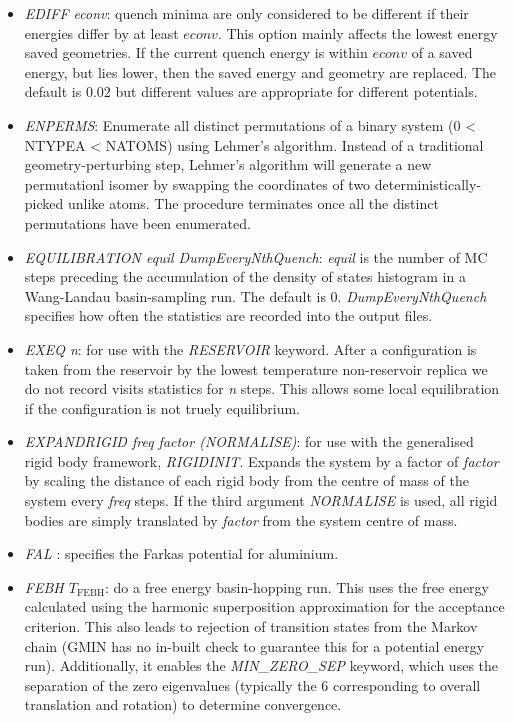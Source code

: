 \documentclass[12pt,a4paper,dvips]{article}
\begin{document}
\begin{itemize}
\item {\it EDIFF econv\/}: quench minima are only considered to be different if their
energies differ by at least $econv$. This option mainly affects the lowest energy
saved geometries. If the current quench energy is within $econv$ of a saved energy, but
lies lower, then the saved energy and geometry are replaced.
The default is $0.02$ but different values are appropriate for different potentials.

\item {\it ENPERMS\/}: Enumerate all distinct permutations of a binary system (0 < NTYPEA < NATOMS) using Lehmer's algorithm. Instead of a traditional geometry-perturbing step, Lehmer's algorithm will generate a new permutationl isomer by swapping the coordinates of two deterministically-picked unlike atoms. The procedure terminates once all the distinct permutations have been enumerated. 
 
\item {\it EQUILIBRATION equil DumpEveryNthQuench\/}: {\it equil} is the number of 
MC steps preceding the accumulation of the
density of states histogram in a Wang-Landau
basin-sampling run. The default is 0. {\it DumpEveryNthQuench} specifies how often the
statistics are recorded into the output files.

\item {\it EXEQ n}: for use with the {\it RESERVOIR\/} keyword. After a configuration is
taken from the reservoir by the lowest temperature non-reservoir replica we do not
record visits statistics for {\it n} steps. This allows some local equilibration if
the configuration is not truely equilibrium.

\item {\it EXPANDRIGID freq factor (NORMALISE)}: for use with the generalised rigid body framework, 
{\it RIGIDINIT}. Expands the system by a factor of {\it factor} by scaling the distance
of each rigid body from the centre of mass of the system every {\it freq} steps. If the third argument {\it NORMALISE}
is used, all rigid bodies are simply translated by {\it factor} from the system centre of mass.


\item {\it FAL \/}: specifies the Farkas potential for aluminium.

\item {\it FEBH $T_\text{FEBH}$\/}: do a free energy basin-hopping run. This uses the free energy
calculated using the harmonic superposition approximation for the acceptance criterion. This also
leads to rejection of transition states from the Markov chain (GMIN has no in-built check to guarantee
this for a potential energy run). Additionally, it enables the {\it MIN\_ZERO\_SEP \/} keyword, which 
uses the separation of the zero eigenvalues (typically the 6 corresponding to overall translation and 
rotation) to determine convergence.


\end{itemize}
\end{document}
